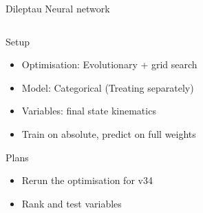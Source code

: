 \begin{frame}{Dileptau Neural network}
\begin{columns}
\begin{column}{0.5\textwidth}
\begin{block}{Setup}
                \begin{itemize}
                    \item Optimisation: Evolutionary + grid search
                    \item Model: Categorical (Treating \tZq separately)
                    \item Variables: final state kinematics
                    \item Train on absolute, predict on full weights
                \end{itemize}
            \end{block}
            \vspace{-0.2cm}
            \begin{block}{Plans}
               \begin{itemize}
                   \item Rerun the optimisation for v34
                   \item Rank and test variables
               \end{itemize} 
            \end{block}
        \end{column}
    \end{columns}
\end{frame}

